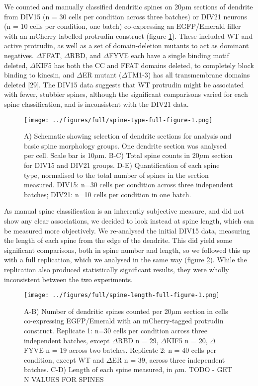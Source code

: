 \documentclass[
  12pt,
  a4paper,
]{book}
\begin{document}
We counted and manually classified dendritic spines on 20\(\mu\)m sections of dendrite from DIV15 (n = 30 cells per condition across three batches) or DIV21 neurons (n = 10 cells per condition, one batch) co-expressing an EGFP/Emerald filler with an mCherry-labelled protrudin construct (figure \ref{fig:spine-type-full-figure}). These included WT and active protrudin, as well as a set of domain-deletion mutants to act as dominant negatives. \(\Delta\)FFAT, \(\Delta\)RBD, and \(\Delta\)FYVE each have a single binding motif deleted, \(\Delta\)KIF5 has both the CC and FFAT domains deleted, to completely block binding to kinesin, and \(\Delta\)ER mutant (\(\Delta\)TM1-3) has all transmembrane domains deleted {[}29{]}. The DIV15 data suggests that WT protrudin might be associated with fewer, stubbier spines, although the significant comparisons varied for each spine classification, and is inconsistent with the DIV21 data.

\begin{figure}
\centering
\texttt{[image: ../figures/full/spine-type-full-figure-1.png]}
\caption{\label{fig:spine-type-full-figure}A) Schematic showing selection of dendrite sections for analysis and basic spine morphology groups. One dendrite section was analysed per cell. Scale bar is 10\(\mu\)m. B-C) Total spine counts in 20\(\mu\)m section for DIV15 and DIV21 groups. D-E) Quantification of each spine type, normalised to the total number of spines in the section measured. DIV15: n=30 cells per condition across three independent batches; DIV21: n=10 cells per condition in one batch.}
\end{figure}

As manual spine classification is an inherently subjective measure, and did not show any clear associations, we decided to look instead at spine length, which can be measured more objectively. We re-analysed the initial DIV15 data, measuring the length of each spine from the edge of the dendrite. This did yield some significant comparisons, both in spine number and length, so we followed this up with a full replication, which we analysed in the same way (figure \ref{fig:spine-length-full-figure}). While the replication also produced statistically significant results, they were wholly inconsistent between the two experiments.

\begin{figure}
\centering
\texttt{[image: ../figures/full/spine-length-full-figure-1.png]}
\caption{\label{fig:spine-length-full-figure}A-B) Number of dendritic spines counted per 20\(\mu\)m section in cells co-expressing EGFP/Emerald with an mCherry-tagged protrudin construct. Replicate 1: n=30 cells per condition across three independent batches, except \(\Delta\)RBD n = 29, \(\Delta\)KIF5 n = 20, \(\Delta\)FYVE n = 19 across two batches. Replicate 2: n = 40 cells per condition, except WT and \(\Delta\)ER n = 39, across three independent batches. C-D) Length of each spine measured, in \(\mu\)m. TODO - GET N VALUES FOR SPINES}
\end{figure}
\end{document}
